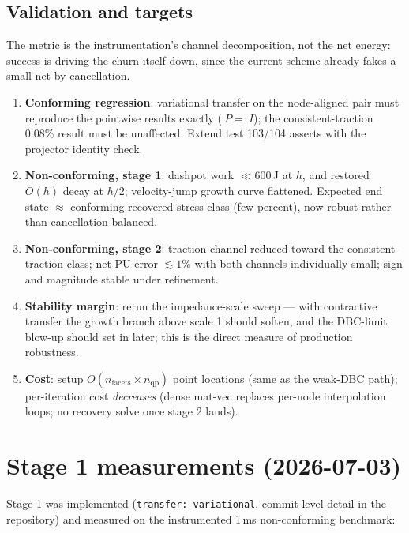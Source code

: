 \documentclass[11pt]{article}
\begin{document}
\subsection{Validation and targets}

The metric is the instrumentation's channel decomposition, not the net
energy: success is driving the churn itself down, since the current
scheme already fakes a small net by cancellation.

\begin{enumerate}
\item \textbf{Conforming regression}: variational transfer on the
      node-aligned pair must reproduce the pointwise results exactly
      ($~P = ~I$); the consistent-traction 0.08\% result must be
      unaffected.  Extend test 103/104 asserts with the projector
      identity check.
\item \textbf{Non-conforming, stage 1}: dashpot work
      $\ll 600$\,J at $h$, and restored $O(h)$ decay at $h/2$;
      velocity-jump growth curve flattened.  Expected end state
      $\approx$ conforming recovered-stress class (few percent), now
      robust rather than cancellation-balanced.
\item \textbf{Non-conforming, stage 2}: traction channel reduced
      toward the consistent-traction class; net PU error
      $\lesssim 1$\% with both channels individually small; sign and
      magnitude stable under refinement.
\item \textbf{Stability margin}: rerun the impedance-scale sweep ---
      with contractive transfer the growth branch above scale 1 should
      soften, and the DBC-limit blow-up should set in later; this is
      the direct measure of production robustness.
\item \textbf{Cost}: setup $O(n_{\mathrm{facets}} \times n_{\mathrm{qp}})$
      point locations (same as the weak-DBC path); per-iteration cost
      \emph{decreases} (dense mat-vec replaces per-node interpolation
      loops; no recovery solve once stage 2 lands).
\end{enumerate}

\section{Stage 1 measurements (2026-07-03)}

Stage 1 was implemented (\texttt{transfer: variational}, commit-level
detail in the repository) and measured on the instrumented 1\,ms
non-conforming benchmark:
\end{document}
